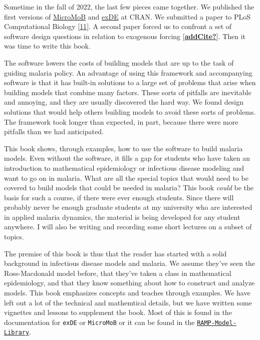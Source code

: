 \documentclass[
]{book}
\begin{document}
Sometime in the fall of 2022, the last few pieces came together. We published the first versions of \href{https://cran.r-project.org/package=MicroMoB}{MicroMoB} and \href{https://CRAN.R-project.org/package=exDE}{exDE} at CRAN. We submitted a paper to PLoS Computational Biology {[}\protect\hyperlink{ref-WuSL2023SpatialDynamics}{11}{]}. A second paper forced us to confront a set of software design questions in relation to exogenous forcing {[}\protect\hyperlink{ref-addCite}{\textbf{addCite?}}{]}.
Then it was time to write this book.

The software lowers the costs of building models that are up to the task of guiding malaria policy.
An advantage of using this framework and accompanying software is that it has built-in solutions to a large set of problems that arise when building models that combine many factors.
These sorts of pitfalls are inevitable and annoying, and they are usually discovered the hard way.
We found design solutions that would help others building models to avoid these sorts of problems.\\
The framework took longer than expected, in part, because there were more pitfalls than we had anticipated.

This book shows, through examples, how to use the software to build malaria models.
Even without the software, it fills a gap for students who have taken an introduction to mathematical epidemiology or infectious disease modeling and want to go on in malaria.
What are all the special topics that would need to be covered to build models that could be needed in malaria?
This book \emph{could} be the basis for such a course, if there were ever enough students.
Since there will probably never be enough graduate students at my university who are interested in applied malaria dynamics, the material is being developed for any student anywhere.
I will also be writing and recording some short lectures on a subset of topics.

The premise of this book is thus that the reader has started with a solid background in infectious disease models and malaria. We assume they've seen the Ross-Macdonald model before, that they've taken a class in mathematical epidemiology, and that they know something about how to construct and analyze models. This book emphasizes concepts and teaches through examples. We have left out a lot of the technical and mathemtical details, but we have written some vignettes and lessons to supplement the book. Most of this is found in the documentation for \texttt{exDE} or \texttt{MicroMoB} or it can be found in the \href{../../RAMP-Model-Library/RAMP-Model-Library.html}{\texttt{RAMP-Model-Library}}.
\end{document}
